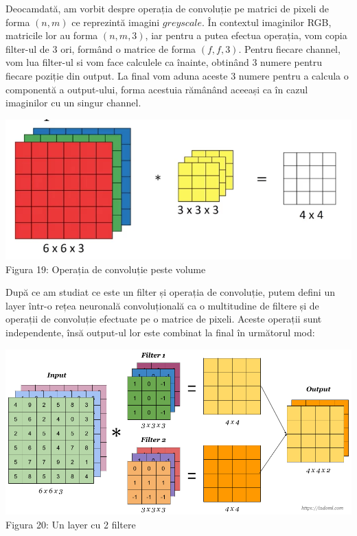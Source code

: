 Deocamdată, am vorbit despre operația de convoluție pe matrici de pixeli de forma $(n,m)$ ce reprezintă imagini $greyscale$. În contextul imaginilor RGB, matricile lor au forma $(n,m,3)$, iar pentru a putea efectua operația, vom copia filter-ul de 3 ori, formând o matrice de forma $(f,f,3)$. Pentru fiecare channel, vom lua filter-ul si vom face calculele ca înainte, obtinând 3 numere pentru fiecare poziție din output. La final vom aduna aceste 3 numere pentru a calcula o componentă a output-ului, forma acestuia rămânând aceeași ca în cazul imaginilor cu un singur channel.

\begin{center}
\includegraphics[scale=0.4]{convVolumes} \\
Figura 19: Operația de convoluție peste volume
\end{center}

După ce am studiat ce este un filter și operația de convoluție, putem defini un layer într-o rețea neuronală convoluțională ca o multitudine de filtere și de operații de convoluție efectuate pe o matrice de pixeli. Aceste operații sunt independente, însă output-ul lor este combinat la final în următorul mod:

\begin{center}
\includegraphics[scale=0.4]{convLayer} \\
Figura 20: Un layer cu 2 filtere
\end{center}


